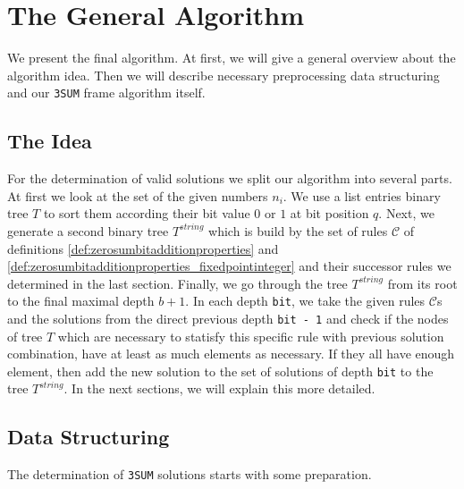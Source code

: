 \section{The General Algorithm}
\label{s:thegeneralalgorithm}
We present the final algorithm. At first, we will give a general overview about the algorithm idea. Then we will describe necessary preprocessing data structuring and our \texttt{3SUM} frame algorithm itself.
\subsection{The Idea}
\label{ss:theidea}
For the determination of valid solutions we split our algorithm into several parts. At first we look at the set of the given numbers $n_{i}$. We use a list entries binary tree $T$ to sort them according their bit value $0$ or $1$ at bit position $q$. Next, we generate a second binary tree $T^{string}$ which is build by the set of rules $\mathcal{C}$ of definitions \ref{def:zerosumbitadditionproperties} and \ref{def:zerosumbitadditionproperties_fixedpointinteger} and their successor rules we determined in the last section. Finally, we go through the tree $T^{string}$ from its root to the final maximal depth $b + 1$. In each depth \texttt{bit}, we take the given rules $\mathcal{C}$s and the solutions from the direct previous depth \texttt{bit - 1} and check if the nodes of tree $T$ which are necessary to statisfy this specific rule with previous solution combination, have at least as much elements as necessary. If they all have enough element, then add the new solution to the set of solutions of depth \texttt{bit} to the tree $T^{string}$. In the next sections, we will explain this more detailed.
\subsection{Data Structuring}
\label{ss:datastructuring}
The determination of \texttt{3SUM} solutions starts with some preparation.

